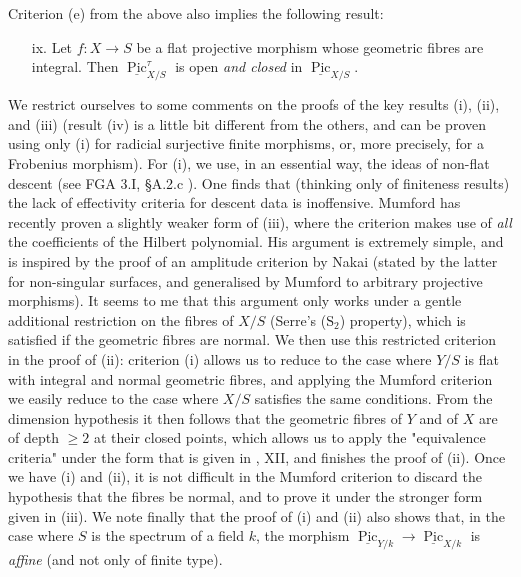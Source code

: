 \begin{remark}
    Criterion (e) from the above also implies the following result:

    \begin{enumerate}
        \item [ix.] Let $f\colon X\to S$ be a flat projective morphism whose geometric fibres are integral.
              Then $\underline{\operatorname{Pic}}_{X/S}^\tau$ is open \emph{and closed} in $\underline{\operatorname{Pic}}_{X/S}$.
    \end{enumerate}


    We restrict ourselves to some comments on the proofs of the key results (i), (ii), and (iii) (result (iv) is a little bit different from the others, and can be proven using only (i) for radicial surjective finite morphisms, or, more precisely, for a Frobenius morphism).
    For (i), we use, in an essential way, the ideas of non-flat descent (see FGA 3.I, §A.2.c ).
    One finds that (thinking only of finiteness results) the lack of effectivity criteria for descent data is inoffensive.
    Mumford has recently proven a slightly weaker form of (iii), where the criterion makes use of \emph{all} the coefficients of the Hilbert polynomial.
    His argument is extremely simple, and is inspired by the proof of an amplitude criterion by Nakai (stated by the latter for non-singular surfaces, and generalised by Mumford to arbitrary projective morphisms).
    It seems to me that this argument only works under a gentle additional restriction on the fibres of $X/S$ (Serre's ($\text{S}_2$) property), which is satisfied if the geometric fibres are normal.
    We then use this restricted criterion in the proof of (ii): criterion (i) allows us to reduce to the case where $Y/S$ is flat with integral and normal geometric fibres, and applying the Mumford criterion we easily reduce to the case where $X/S$ satisfies the same conditions.
    From the dimension hypothesis it then follows that the geometric fibres of $Y$ and of $X$ are of depth $\geqslant2$ at their closed points, which allows us to apply the "equivalence criteria" under the form that is given in \cite{Gro1960b}, XII, and finishes the proof of (ii).
    Once we have (i) and (ii), it is not difficult in the Mumford criterion to discard the hypothesis that the fibres be normal, and to prove it under the stronger form given in (iii).
    We note finally that the proof of (i) and (ii) also shows that, in the case where $S$ is the spectrum of a field $k$, the morphism $\underline{\operatorname{Pic}}_{Y/k}\to\underline{\operatorname{Pic}}_{X/k}$ is \emph{affine} (and not only of finite type).
\end{remark}